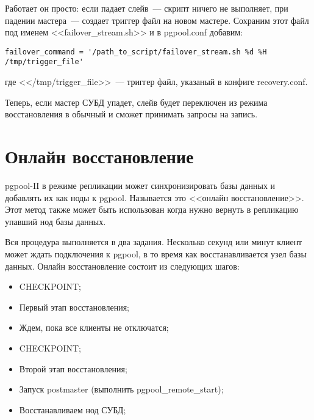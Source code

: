 Работает он просто: если падает слейв~--- скрипт ничего не выполняет, при падении мастера~--- 
создает триггер файл на новом мастере. Сохраним этот файл под именем <<failover\_stream.sh>> и 
в pgpool.conf добавим:
\begin{lstlisting}[label=lst:pgpool41,caption=Что выполнять при падении нода]
failover_command = '/path_to_script/failover_stream.sh %d %H /tmp/trigger_file'
\end{lstlisting}
где <</tmp/trigger\_file>>~--- триггер файл, указаный в конфиге recovery.conf.

Теперь, если мастер СУБД упадет, слейв будет переключен из режима восстановления в обычный и сможет принимать запросы на запись.

\section{Онлайн восстановление}
pgpool-II в режиме репликации может синхронизировать базы данных и добавлять их как ноды к pgpool. 
Называется это <<онлайн восстановление>>. Этот метод также может быть использован когда нужно вернуть 
в репликацию упавший нод базы данных.

Вся процедура выполняется в два задания. Несколько секунд или минут клиент может ждать подключения к pgpool, 
в то время как восстанавливается узел базы данных. Онлайн восстановление состоит из следующих шагов:
\begin{itemize}
\item CHECKPOINT;
\item Первый этап восстановления;
\item Ждем, пока все клиенты не отключатся;
\item CHECKPOINT;
\item Второй этап восстановления;
\item Запуск postmaster (выполнить pgpool\_remote\_start);
\item Восстанавливаем нод СУБД;
\end{itemize}

